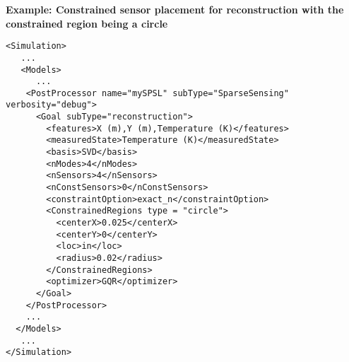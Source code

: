 \textbf{Example: Constrained sensor placement for reconstruction with the constrained region being a circle}
\begin{lstlisting}[style=XML]
<Simulation>
   ...
   <Models>
      ...
    <PostProcessor name="mySPSL" subType="SparseSensing" verbosity="debug">
      <Goal subType="reconstruction">
        <features>X (m),Y (m),Temperature (K)</features>
        <measuredState>Temperature (K)</measuredState>
        <basis>SVD</basis>
        <nModes>4</nModes>
        <nSensors>4</nSensors>
        <nConstSensors>0</nConstSensors>
        <constraintOption>exact_n</constraintOption>
        <ConstrainedRegions type = "circle"> 
          <centerX>0.025</centerX>
          <centerY>0</centerY>
          <loc>in</loc>
          <radius>0.02</radius>
        </ConstrainedRegions>
        <optimizer>GQR</optimizer>
      </Goal>
    </PostProcessor>
    ...
  </Models>
   ...
</Simulation>
\end{lstlisting}
